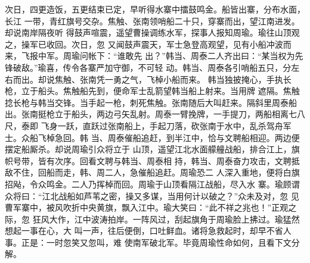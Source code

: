 次日，四更造饭，五更结束已定，早听得水寨中擂鼓鸣金。船皆出寨，分布水面，长江
一带，青红旗号交杂。焦触、张南领哨船二十只，穿寨而出，望江南进发。却说南岸隔夜听
得鼓声喧震，遥望曹操调练水军，探事人报知周瑜。瑜往山顶观之，操军已收回。次日，忽
又闻鼓声震天，军士急登高观望，见有小船冲波而来，飞报中军。周瑜问帐下：“谁敢先
出？”韩当、周泰二人齐出曰：“某当权为先锋破敌。”瑜喜，传令各寨严加守御，不可轻
动。韩当、周泰各引哨船五只，分左右而出。却说焦触、张南凭一勇之气，飞棹小船而来。
韩当独披掩心，手执长枪，立于船头。焦触船先到，便命军士乱箭望韩当船上射来。当用牌
遮隔。焦触捻长枪与韩当交锋。当手起一枪，刺死焦触。张南随后大叫赶来。隔斜里周泰船
出。张南挺枪立于船头，两边弓矢乱射。周泰一臂挽牌，一手提刀，两船相离七八尺，泰即
飞身一跃，直跃过张南船上，手起刀落，砍张南于水中，乱杀驾舟军士。众船飞棹急回。韩
当、周泰催船追赶，到半江中，恰与文聘船相迎。两边便摆定船厮杀。却说周瑜引众将立于
山顶，遥望江北水面艨艟战船，排合江上，旗帜号带，皆有次序。回看文聘与韩当、周泰相
持，韩当、周泰奋力攻击，文聘抵敌不住，回船而走，韩、周二人，急催船追赶。周瑜恐二
人深入重地，便将白旗招飐，令众鸣金。二人乃挥棹而回。周瑜于山顶看隔江战船，尽入水
寨。瑜顾谓众将曰：“江北战船如芦苇之密，操又多谋，当用何计以破之？”众未及对，忽
见曹军寨中，被风吹折中央黄旗，飘入江中。瑜大笑曰：“此不祥之兆也！”正观之际，忽
狂风大作，江中波涛拍岸。一阵风过，刮起旗角于周瑜脸上拂过。瑜猛然想起一事在心，大
叫一声，往后便倒，口吐鲜血。诸将急救起时，却早不省人事。正是：一时忽笑又忽叫，难
使南军破北军。毕竟周瑜性命如何，且看下文分解。